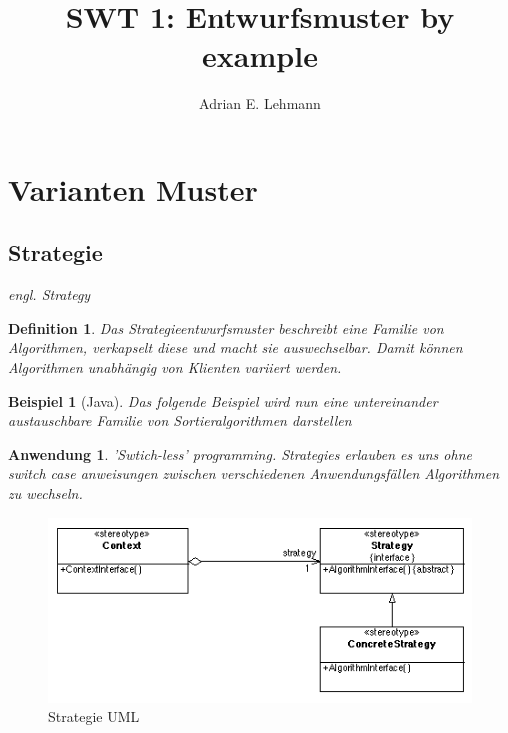 \documentclass[a4paper]{article}
\title{SWT 1: Entwurfsmuster by example}
\author{Adrian E. Lehmann}
\theoremstyle{break}
\newtheorem{defi}{Definition}[section]
\newtheorem{ex}{Beispiel}[section]
\newtheorem{why}{Anwendung}[section]
\begin{document}
\maketitle
\tableofcontents
\newpage

\section{Varianten Muster}

\subsection{Strategie}

\textit{engl. Strategy}

\begin{defi}
	Das Strategieentwurfsmuster beschreibt eine Familie von Algorithmen, verkapselt diese und macht sie auswechselbar. Damit können Algorithmen unabhängig von Klienten variiert werden.
\end{defi}

\begin{ex}[Java]
	Das folgende Beispiel wird nun eine untereinander austauschbare Familie von Sortieralgorithmen darstellen


	
	
	
	
		
\end{ex}

\begin{why}
	'Swtich-less' programming. Strategies erlauben es uns ohne switch case anweisungen zwischen verschiedenen Anwendungsfällen Algorithmen zu wechseln.
\end{why}
\begin{figure}[H]
	\centering
	\includegraphics[width=\textwidth]{../uml/StrategyPattern.png}
	\caption{Strategie UML}
	\label{fig3}
\end{figure}
\end{document}
